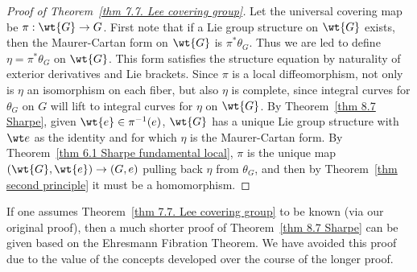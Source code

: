 \begin{proof}[Proof of Theorem~\ref{thm 7.7. Lee covering group}]
    Let the universal covering map be $\pi:\wt{G}\to G$. First note that if a Lie group structure on $\wt{G}$ exists, then the Maurer-Cartan form on $\wt{G}$ is $\pi^\ast \theta_G$. Thus we are led to define $\eta=\pi^\ast\theta_G$ on $\wt{G}$. This form satisfies the structure equation by naturality of exterior derivatives and Lie brackets. Since $\pi$ is a local diffeomorphism, not only is $\eta$ an isomorphism on each fiber, but also $\eta$ is complete, since integral curves for $\theta_G$ on $G$ will lift to integral curves for $\eta$ on $\wt{G}$. By Theorem~\ref{thm 8.7 Sharpe}, given $\wt{e}\in \pi^{-1}(e)$, $\wt{G}$ has a unique Lie group structure with $\wt e$ as the identity and for which $\eta$ is the Maurer-Cartan form. By Theorem~\ref{thm 6.1 Sharpe fundamental local}, $\pi$ is the unique map $(\wt{G},\wt{e})\to (G,e)$ pulling back $\eta$ from $\theta_G$, and then by Theorem~\ref{thm second principle} it must be a homomorphism.
\end{proof}

If one assumes Theorem~\ref{thm 7.7. Lee covering group} to be known (via our original proof), then a much shorter proof of Theorem~\ref{thm 8.7 Sharpe} can be given based on the Ehresmann Fibration Theorem. We have avoided this proof due to the value of the concepts developed over the course of the longer proof.

